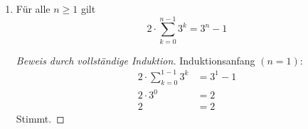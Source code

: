 \documentclass{scrartcl} %
\begin{document}
    \begin{aufgabe}
        \begin{enumerate}[label=(\alph*)]
            \item \begin{theorem}
                Für alle $n \geq 1$ gilt
                \[
                    2 \cdot \sum_{k = 0}^{n - 1}3^k = 3^n - 1                
                \]
            \end{theorem}
            \begin{proof}[Beweis durch vollständige Induktion]\label{proof:3i}
                Induktionsanfang $(n = 1)$:
                \begin{align*}
                    2\cdot \sum_{k = 0}^{1 - 1}3^k &= 3^1 - 1\\
                    2\cdot 3^0 &= 2\\
                    2 &= 2
                \end{align*}
                Stimmt.


\end{proof}
\end{enumerate}
\end{aufgabe}
\end{document}
